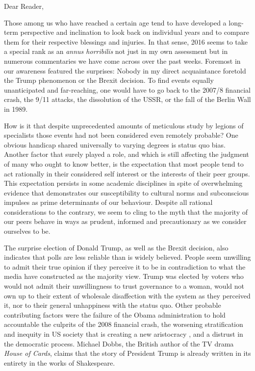 \documentclass[10pt,a4paper]{article}
\begin{document}
\begin{multicols}{2}


\noindent Dear Reader,

Those among us who have reached a certain age tend to have developed a long-term perspective and inclination to look back on individual years and to compare them for their respective blessings and injuries. In that sense, 2016 seems to take a special rank as an \textit{annus horribilis} not just in my own assessment but in numerous commentaries we have come across over the past weeks. Foremost in our awareness featured the surprises: Nobody in my direct acquaintance foretold the Trump phenomenon or the Brexit decision. To find events equally unanticipated and far-reaching, one would have to go back to the 2007/8 financial crash, the 9/11 attacks, the dissolution of the USSR, or the fall of the Berlin Wall in 1989.

How is it that despite unprecedented amounts of meticulous study by legions of specialists those events had not been considered even remotely probable? One obvious handicap shared universally to varying degrees is status quo bias. Another factor that surely played a role, and which is still affecting the judgment of many who ought to know better, is the expectation that most people tend to act rationally in their considered self interest or the interests of their peer groups. This expectation persists in some academic disciplines in spite of overwhelming evidence that demonstrates our susceptibility to cultural norms and subconscious impulses as prime determinants of our behaviour. Despite all rational considerations to the contrary, we seem to cling to the myth that the majority of our peers behave in ways as prudent, informed and precautionary as we consider ourselves to be.

The surprise election of Donald Trump, as well as the Brexit decision, also indicates that polls are less reliable than is widely believed. People seem unwilling to admit their true opinion if they perceive it to be in contradiction to what the media have constructed as the majority view. Trump was elected by voters who would not admit their unwillingness to trust governance to a woman, would not own up to their extent of wholesale disaffection with the system as they perceived it, nor to their general unhappiness with the status quo. Other probable contributing factors were the failure of the Obama administration to hold accountable the culprits of the 2008 financial crash, the worsening stratification and inequity in US society that is creating a new aristocracy \citep{r01}, and a distrust in the democratic process. Michael Dobbs, the British author of the TV drama \textit{House of Cards}, claims that the story of President Trump is already written in its entirety in the works of Shakespeare. 


\end{multicols}
\end{document}
